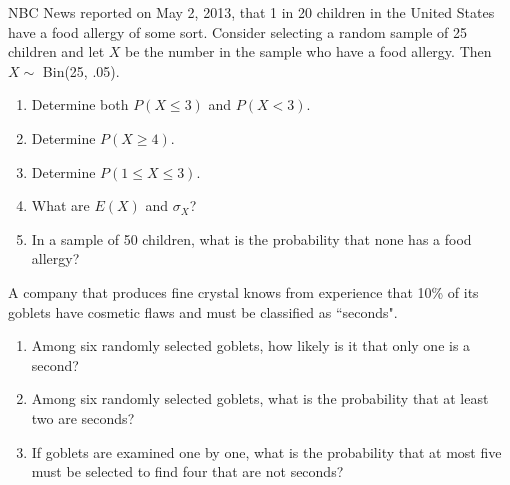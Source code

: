 \documentclass[11pt,letterpaper,boxed]{hmcpset}
\begin{document}
 {



\begin{problem}[3.4.48]
	NBC News reported on May 2, 2013, that 1 in 20 children in the United States have a food allergy of some sort. Consider selecting a random sample of 25 children and let $X$ be the number in the sample who have a food allergy. Then $X \sim$ Bin(25, .05).
	\begin{enumerate}
		\item
			Determine both $P(X \leq 3)$ and $P(X < 3)$.
		\item
			Determine $P(X \geq 4)$.
		\item
			Determine $P(1 \leq X \leq 3)$.
		\item
			What are $E(X)$ and $\sigma_X$?
		\item 
			In a sample of 50 children, what is the probability that none has a food allergy?
	\end{enumerate}
\end{problem}

\begin{solution}
	\vfill
\end{solution}
\newpage


\begin{problem}[3.4.49]
	A company that produces fine crystal knows from experience that 10\% of its goblets have cosmetic flaws and must be classified as ``seconds".
	\begin{enumerate}
		\item
			Among six randomly selected goblets, how likely is it that only one is a second?
		\item
			Among six randomly selected goblets, what is the probability that at least two are seconds?
		\item
			If goblets are examined one by one, what is the probability that at most five must be selected to find four that are not seconds?
	\end{enumerate}
\end{problem}

\begin{solution}
	\vfill
\end{solution}
\newpage


}
\end{document}
